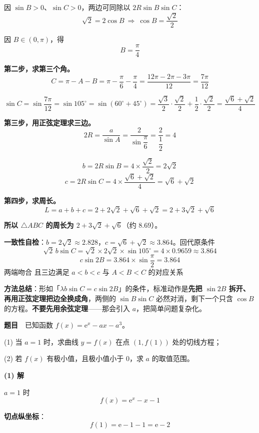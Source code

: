 因 $\sin B>0$、$\sin C>0$，两边可同除以 $2R\sin B\sin C$：
\[\sqrt2=2\cos B\ \Longrightarrow\ \cos B=\frac{\sqrt2}2\]

因 $B\in(0,\pi)$，得
\[B=\frac\pi4\]

\textbf{第二步，求第三个角。}
\[C=\pi-A-B=\pi-\frac\pi6-\frac\pi4=\frac{12\pi-2\pi-3\pi}{12}=\frac{7\pi}{12}\]

\[\sin C=\sin\frac{7\pi}{12}=\sin105^{\circ}=\sin\left(60^{\circ}+45^{\circ}\right)=\frac{\sqrt3}2\cdot\frac{\sqrt2}2+\frac12\cdot\frac{\sqrt2}2=\frac{\sqrt6+\sqrt2}4\]

\textbf{第三步，用正弦定理求三边。}
\[2R=\frac a{\sin A}=\frac2{\sin\dfrac\pi6}=\frac2{\dfrac12}=4\]

\[b=2R\sin B=4\times\frac{\sqrt2}2=2\sqrt2\]
\[c=2R\sin C=4\times\frac{\sqrt6+\sqrt2}4=\sqrt6+\sqrt2\]

\textbf{第四步，求周长。}
\[L=a+b+c=2+2\sqrt2+\sqrt6+\sqrt2=2+3\sqrt2+\sqrt6\]

\textbf{所以 $\triangle ABC$ 的周长为 $2+3\sqrt2+\sqrt6$}（约 $8.69$）。

\begin{gktip}
\textbf{一致性自检}：$b=2\sqrt2\approx2.828$，$c=\sqrt6+\sqrt2\approx3.864$。回代原条件
\[\sqrt2\,b\sin C=\sqrt2\times2\sqrt2\times\sin105^{\circ}=4\times0.9659\approx3.864\]
\[c\sin2B=3.864\times\sin\frac\pi2=3.864\]
两端吻合  且三边满足 $a<b<c$ 与 $A<B<C$ 的对应关系 

\textbf{方法总结}：形如「$\lambda b\sin C=c\sin2B$」的条件，标准动作是\textbf{先把 $\sin2B$ 拆开、再用正弦定理把边全换成角}，两侧的 $\sin B\sin C$ 必然对消，剩下一个只含 $\cos B$ 的方程。\textbf{不要先用余弦定理}——那会引入 $a$，把简单问题复杂化。
\end{gktip}

\par\medskip


\textbf{题目}　已知函数 $f(x)=\mathrm e^{x}-ax-a^{3}$。

  (1) 当 $a=1$ 时，求曲线 $y=f(x)$ 在点 $\left(1,f(1)\right)$ 处的切线方程；

  (2) 若 $f(x)$ 有极小值，且极小值小于 $0$，求 $a$ 的取值范围。

\par\medskip

\textbf{(1) 解}

$a=1$ 时
\[f(x)=\mathrm e^{x}-x-1\]

\textbf{切点纵坐标}：
\[f(1)=\mathrm e-1-1=\mathrm e-2\]

